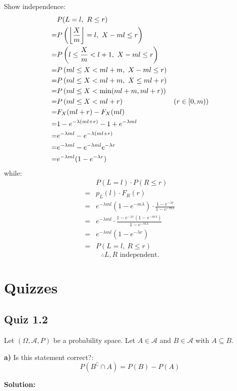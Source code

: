 \documentclass{article}
\begin{document}
Show independence:
\begin{align*}
    & P(L=l,\ R\leq r) \\
    =& P\left(\left\lfloor\frac{X}{m}\right\rfloor=l,\ X-ml\leq r\right) \\
    =& P\left(l \leq \frac{X}{m} < l+1,\ X-ml\leq r\right) \\
    =& P\left(ml \leq X < ml+m,\ X-ml\leq r\right) \\
    =& P\left(ml \leq X < ml+m,\ X\leq ml+r\right) \\
    =& P\left(ml \leq X < \min(ml+m,ml+r)\right) \\
    =& P\left(ml \leq X < ml+r\right) & (r \in [0,m)) \\
    =& F_X(ml+r) - F_X(ml) \\
    =& 1-e^{-\lambda(ml+r)} - 1 + e^{-\lambda ml} \\
    =& e^{-\lambda ml}-e^{-\lambda (ml+r)} \\
    =& e^{-\lambda ml}-e^{-\lambda ml}e^{-\lambda r} \\
    =& e^{-\lambda ml}(1-e^{-\lambda r})
\end{align*}
while:
\begin{align*}
    & P(L=l) \cdot P(R\leq r) \\
    =& p_L(l) \cdot F_R(r) \\
    =& e^{-\lambda ml} (1-e^{-m\lambda}) \cdot \frac{1-e^{-\lambda r}}{1-e^{-m\lambda}} \\
    =& e^{-\lambda ml} \cdot \frac{1-e^{-\lambda r}(1-e^{-m\lambda})}{1-e^{-m\lambda}} \\
    =& e^{-\lambda ml} (1-e^{-\lambda r}) \\
    =& P(L=l,\ R\leq r)
\end{align*}
\[\therefore L,R \text{ independent.}\]

\section{Quizzes}
\subsection{Quiz 1.2}

Let \((\Omega, \mathcal{A}, P)\) be a probability space.
Let \(A\in \mathcal{A}\) and \(B\in \mathcal{A}\)
with \(A\subseteq B\).

\textbf{a)} Is this statement correct?:
\[P(B^\complement \cap A) = P(B)-P(A)\]

\textbf{Solution:}
\end{document}

